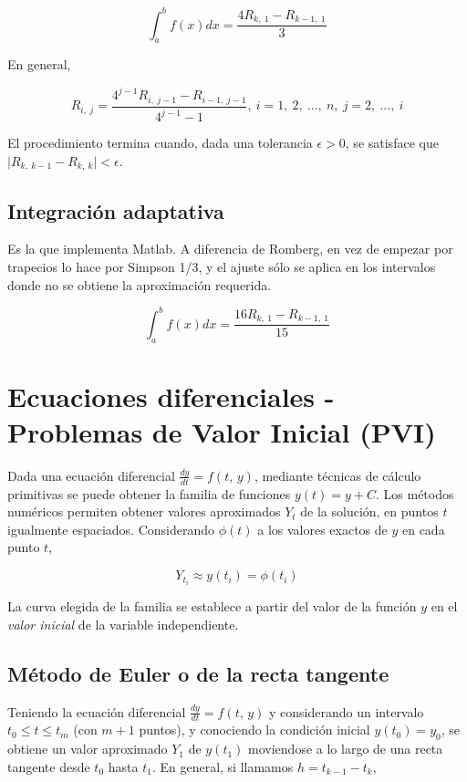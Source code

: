 \documentclass{article}
\begin{document}
\begin{equation*}
\int_{a}^{b} f(x)dx = \frac{4R_{k,\ 1} - R_{k-1,\ 1}}{3}
\end{equation*}

En general, 

\begin{equation*}
R_{i,\ j} = \frac{4^{j-1} R_{i,\ j-1} - R_{i-1,\ j-1}}{4^{j-1} - 1},\ 
i = 1,\ 2,\ ...,\ n,\ j = 2,\ ...,\ i
\end{equation*}

El procedimiento termina cuando, dada una tolerancia $\epsilon>0$, se satisface
que $\vert R_{k,\ k-1} - R_{k,\ k}\vert < \epsilon$.

\subsection{Integración adaptativa}

Es la que implementa Matlab. A diferencia de Romberg, en vez de empezar por 
trapecios lo hace por Simpson 1/3, y el ajuste sólo se aplica en los intervalos
donde no se obtiene la aproximación requerida.

\begin{equation*}
\int_{a}^{b} f(x)dx = \frac{16R_{k,\ 1} - R_{k-1,\ 1}}{15}
\end{equation*}


\section{Ecuaciones diferenciales - Problemas de Valor Inicial (PVI)}

Dada una ecuación diferencial $\frac{dy}{dt} = f(t,\,y)$, mediante técnicas de
cálculo primitivas se puede obtener la familia de funciones $y(t) = y + C$. Los 
métodos numéricos permiten obtener valores aproximados $Y_t$ de la solución, en
puntos $t$ igualmente espaciados. Considerando $\phi(t)$ a los valores exactos 
de $y$ en cada punto $t$,

\[ Y_{t_i} \approx y(t_i) = \phi(t_i) \]

La curva elegida de la familia se establece a partir del valor de la función $y$
en el \emph{valor inicial} de la variable independiente.

\subsection{Método de Euler o de la recta tangente}

Teniendo la ecuación diferencial $\frac{dy}{dt} = f(t,\,y)$ y considerando un 
intervalo $t_0 \leq t \leq t_m$ (con $m+1$ puntos), y conociendo la condición
inicial $y(t_0) = y_0$, se obtiene un valor aproximado $Y_1$ de $y(t_1)$ 
moviendose a lo largo de una recta tangente desde $t_0$ hasta $t_1$. En general,
si llamamos $h = t_{k-1} - t_k$,
\end{document}
